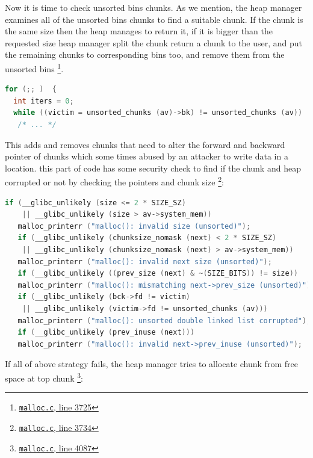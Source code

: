 \documentclass{masterthesis}
\newcommand*\ub{unsorted bins}
\begin{document}
Now it is time to check \ub{} chunks. As we mention, the heap manager examines all of the \ub{} chunks to find a suitable chunk. If the chunk is the same size then the heap manages to return it, if it is bigger than the requested size heap manager split the chunk return a chunk to the user, and put the remaining chunks to corresponding bins too, and remove them from the \ub{} \footnote{\href{https://sourceware.org/git/?p=glibc.git;a=blob;f=malloc/malloc.c;h=f7cd29bc2f93e1082ee77800bd64a4b2a2897055;hb=9ea3686266dca3f004ba874745a4087a89682617\#l3725}{\texttt{malloc.c}, line 3725}}.

\begin{lstlisting}[language=c]
for (;; )  {
  int iters = 0;
  while ((victim = unsorted_chunks (av)->bk) != unsorted_chunks (av))
   /* ... */ 
\end{lstlisting}
This adds and removes chunks that need to alter the forward and backward pointer of chunks which some times abused by an attacker to write data in a location. this part of code has some security check to find if the chunk and heap corrupted or not by checking the pointers and chunk size \footnote{\href{https://sourceware.org/git/?p=glibc.git;a=blob;f=malloc/malloc.c;h=f7cd29bc2f93e1082ee77800bd64a4b2a2897055;hb=9ea3686266dca3f004ba874745a4087a89682617\#l3734}{\texttt{malloc.c}, line 3734}}:
\begin{lstlisting}[language=c,frame=tlrb]
   if (__glibc_unlikely (size <= 2 * SIZE_SZ)
    || __glibc_unlikely (size > av->system_mem))
   malloc_printerr ("malloc(): invalid size (unsorted)");
   if (__glibc_unlikely (chunksize_nomask (next) < 2 * SIZE_SZ)
    || __glibc_unlikely (chunksize_nomask (next) > av->system_mem))
   malloc_printerr ("malloc(): invalid next size (unsorted)");
   if (__glibc_unlikely ((prev_size (next) & ~(SIZE_BITS)) != size))
   malloc_printerr ("malloc(): mismatching next->prev_size (unsorted)");
   if (__glibc_unlikely (bck->fd != victim)
    || __glibc_unlikely (victim->fd != unsorted_chunks (av)))
   malloc_printerr ("malloc(): unsorted double linked list corrupted");
   if (__glibc_unlikely (prev_inuse (next)))
   malloc_printerr ("malloc(): invalid next->prev_inuse (unsorted)");
\end{lstlisting}

If all of above strategy fails, the heap manager tries to allocate chunk from free space at top chunk \footnote{\href{https://sourceware.org/git/?p=glibc.git;a=blob;f=malloc/malloc.c;h=f7cd29bc2f93e1082ee77800bd64a4b2a2897055;hb=9ea3686266dca3f004ba874745a4087a89682617\#l4087}{\texttt{malloc.c}, line 4087}}:
\end{document}
